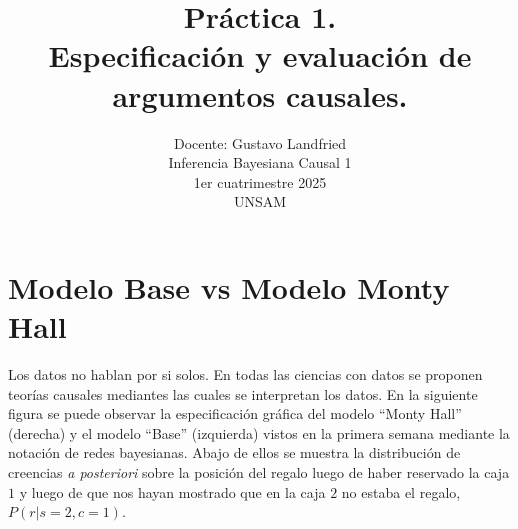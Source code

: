 \documentclass[a4paper,10pt]{article}
\title{Práctica 1. \\ Especificación y evaluación de argumentos causales.}
\author{Docente: Gustavo Landfried \\ Inferencia Bayesiana Causal 1\\ 1er cuatrimestre  2025 \\ UNSAM}
\date{}
\begin{document}
\maketitle

\tableofcontents

\newpage

\section{Modelo Base vs Modelo Monty Hall}

Los datos no hablan por si solos.
%
En todas las ciencias con datos se proponen teorías causales mediantes las cuales se interpretan los datos.
%
En la siguiente figura se puede observar la especificación gráfica del modelo ``Monty Hall'' (derecha) y el modelo ``Base'' (izquierda) vistos en la primera semana mediante la notación de redes bayesianas.
%
Abajo de ellos se muestra la distribución de creencias \textit{a posteriori} sobre la posición del regalo luego de haber reservado la caja $1$ y luego de que nos hayan mostrado que en la caja $2$ no estaba el regalo, $P(r|s=2,c=1)$.
\end{document}

